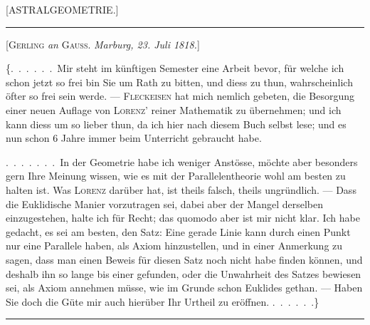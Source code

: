 \clearpage
\begin{center}[ASTRALGEOMETRIE.]\end{center}

\begin{center}\rule{3cm}{0.4pt}\end{center}

\begin{center}[\textsc{Gerling} \emph{an} \textsc{Gauss}. \emph{Marburg, 23. Juli 1818.}]\end{center}

\{.\ .\ .\ .\ .\ .\ Mir steht im künftigen Semester eine Arbeit bevor, für welche ich
schon jetzt so frei bin Sie um Rath zu bitten, und diess zu thun,
wahrscheinlich öfter so frei sein werde. --- \textsc{Fleckeisen} hat mich
nemlich gebeten, die Besorgung einer neuen Auflage von \textsc{Lorenz}’
reiner Mathematik zu übernehmen; und ich kann diess um so lieber thun, da
ich hier nach diesem Buch selbst lese; und es nun schon 6 Jahre immer beim
Unterricht gebraucht habe.

.\ .\ .\ .\ .\ .\ .\ In der Geometrie habe ich weniger Anstösse, möchte aber besonders
gern Ihre Meinung wissen, wie es mit der Parallelentheorie wohl am besten zu
halten ist. Was \textsc{Lorenz} darüber hat, ist theils falsch, theils
ungründlich. --- Dass die Euklidische Manier vorzutragen sei, dabei aber der
Mangel derselben einzugestehen, halte ich für Recht; das quomodo aber ist
mir nicht klar. Ich habe gedacht, es sei am besten, den Satz: Eine gerade
Linie kann durch einen Punkt nur eine Parallele haben, als Axiom
hinzustellen, und in einer Anmerkung zu sagen, dass man einen Beweis für
diesen Satz noch nicht habe finden können, und deshalb ihn so lange bis
einer gefunden, oder die Unwahrheit des Satzes bewiesen sei, als Axiom
annehmen müsse, wie im Grunde schon Euklides gethan. --- Haben Sie doch die
Güte mir auch hierüber Ihr Urtheil zu eröffnen. .\ .\ .\ .\ .\ .\}

\begin{center}\rule{3cm}{0.4pt}\end{center}

